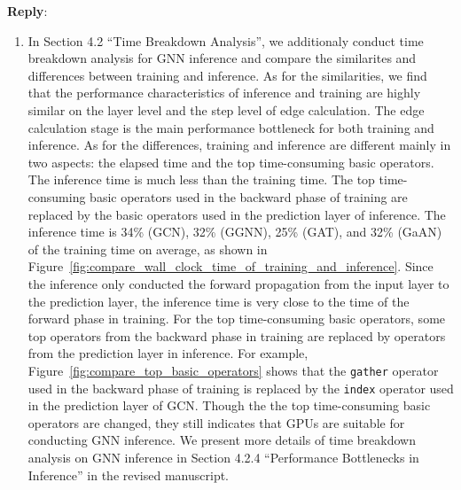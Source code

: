 \documentclass[12pt]{article}
\newenvironment{reply}
   {\medskip \noindent \textbf{Reply}:\  }
   {\medskip}
\begin{document}
\begin{reply}
\begin{enumerate}
    \item In Section 4.2 ``Time Breakdown Analysis'', we additionaly conduct time breakdown analysis for GNN inference and compare the similarites and differences between training and inference.
    As for the similarities, we find that the performance characteristics of inference and training are highly similar on the layer level and the step level of edge calculation.
    The edge calculation stage is the main performance bottleneck for both training and inference.
    As for the differences, training and inference are different mainly in two aspects: the elapsed time and the top time-consuming basic operators.
    The inference time is much less than the training time.
    The top time-consuming basic operators used in the backward phase of training are replaced by the basic operators used in the prediction layer of inference.
    The inference time is 34\% (GCN), 32\% (GGNN), 25\% (GAT), and 32\% (GaAN) of the training time on average, as shown in Figure~\ref{fig:compare_wall_clock_time_of_training_and_inference}.
    Since the inference only conducted the forward propagation from the input layer to the prediction layer, the inference time is very close to the time of the forward phase in training.
    For the top time-consuming basic operators, some top operators from the backward phase in training are replaced by operators from the prediction layer in inference.
    For example, Figure~\ref{fig:compare_top_basic_operators} shows that the \texttt{gather} operator used in the backward phase of training is replaced by the \texttt{index} operator used in the prediction layer of GCN.
    Though the the top time-consuming basic operators are changed, they still indicates that GPUs are suitable for conducting GNN inference.
    We present more details of time breakdown analysis on GNN inference in Section 4.2.4 ``Performance Bottlenecks in Inference'' in the revised manuscript.
        

\end{enumerate}
\end{reply}
\end{document}
